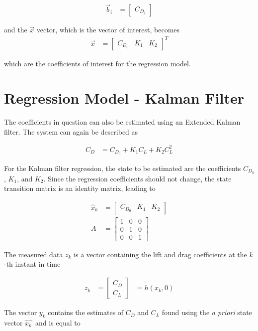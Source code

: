 \documentclass[12pt]{ucthesis}
\begin{document}
\begin{align}
\vec{b}_i &=
\begin{bmatrix}
C_{D_i}
\end{bmatrix}
\end{align}

and the $\vec{x}$ vector, which is the vector of interest, becomes
\begin{align}
\vec{x} &=
\begin{bmatrix}
C_{D_0} & K_1 & K_2
\end{bmatrix}^T
\end{align}

which are the coefficients of interest for the regression model.
\section{Regression Model - Kalman Filter}
The coefficients in question can also be estimated using an Extended Kalman filter. The system can again be described as 

\begin{align}
C_D &= C_{D_0}+K_1C_L+K_2C^2_L
\end{align}

For the Kalman filter regression, the state to be estimated are the coefficients $C_{D_0}$, $K_1$, and $K_2$. Since the regression coefficients should not change, the state transition matrix is an identity matrix, leading to

\begin{align}
\hat{x}_k &= \begin{bmatrix}
C_{D_0} & K_1 & K_2
\end{bmatrix}\\
A &= \begin{bmatrix}
1&0&0\\0&1&0\\0&0&1
\end{bmatrix}
\end{align}


The measured data $z_k$ is a vector containing the lift and drag coefficients at the $k$-th instant in time

\begin{align}
z_k &= \begin{bmatrix}
C_D\\C_L
\end{bmatrix} &= h(x_{k},0)
\end{align}


The vector $y_k$ contains the estimates of $C_D$ and $C_L$ found using the \textit{a priori} state vector $\hat{x}^-_k$ and is equal to
\end{document}
